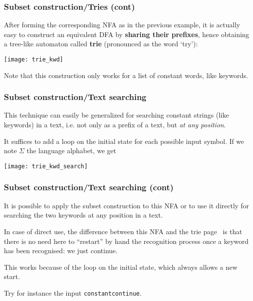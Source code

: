 % 
\begin{frame}
\frametitle{Subset construction/Tries (cont)}

\label{trie_kwd}

After forming the corresponding NFA as in the previous example, it is
actually easy to construct an equivalent DFA by \textbf{sharing their
  prefixes}, hence obtaining a tree-like automaton called
\textbf{trie} (pronounced as the word `try'):
\begin{center}
\texttt{[image: trie\_kwd]}
\end{center}
Note that this construction only works for a list of constant words,
like keywords.

\end{frame}

% 
\begin{frame}
\frametitle{Subset construction/Text searching}

This technique can easily be generalized for searching constant
strings (like keywords) in a text, i.e. not only as a prefix of a
text, but \emph{at any position}.

\bigskip

It suffices to add a loop on the initial state for each possible input
symbol. If we note \(\Sigma\) the language alphabet, we get
\begin{center}
\texttt{[image: trie\_kwd\_search]}
\end{center}

\end{frame}

% 
\begin{frame}
\frametitle{Subset construction/Text searching (cont)}

It is possible to apply the subset construction to this NFA or to use
it directly for searching the two keywords at any position in a text.

\bigskip

In case of direct use, the difference between this NFA and the trie
page~\pageref{trie_kwd} is that there is no need here to ``restart''
by hand the recognition process once a keyword has been recognised: we
just continue.

\bigskip

This works because of the loop on the initial state, which always
allows a new start.

\bigskip

Try for instance the input \texttt{constantcontinue}.

\end{frame}

